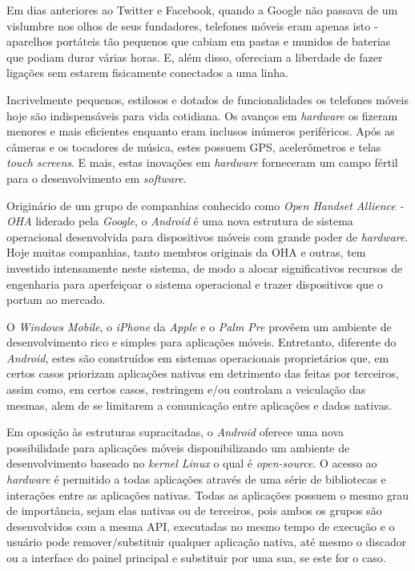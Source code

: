 \documentclass[12pt,a4paper,oneside]{report}
\begin{document}
Em dias anteriores ao Twitter e Facebook, quando a Google não passava de um vislumbre nos olhos de seus fundadores, telefones móveis eram apenas isto - aparelhos portáteis tão pequenos que cabiam em pastas e munidos de baterias que podiam durar várias horas. E, além disso, ofereciam a liberdade de fazer ligações sem estarem fisicamente conectados a uma linha.

Incrivelmente pequenos, estilosos e dotados de funcionalidades os telefones móveis hoje são indispensáveis para vida cotidiana. Os avanços em \emph{hardware} os fizeram menores e mais eficientes enquanto eram inclusos inúmeros periféricos. Após as câmeras e os tocadores de música, estes possuem GPS, acelerômetros e telas \emph{touch screens}. E mais, estas inovações em \emph{hardware} forneceram um campo fértil para o desenvolvimento em \emph{software}.

Originário de um grupo de companhias conhecido como \emph{Open Handset Allience - OHA} liderado pela \emph{Google}, o \emph{Android} é uma nova estrutura de sistema operacional desenvolvida para dispositivos móveis com grande poder de \emph{hardware}. Hoje muitas companhias, tanto membros originais da OHA e outras, tem investido intensamente neste sistema, de modo a alocar significativos recursos de engenharia para aperfeiçoar o sistema operacional e trazer dispositivos que o portam ao mercado.

O \emph{Windows Mobile}, o \emph{iPhone} da \emph{Apple} e o \emph{Palm Pre} provêem um  ambiente de desenvolvimento rico e simples para aplicações móveis. Entretanto, diferente do \emph{Android}, estes são construídos em sistemas operacionais proprietários que, em certos casos priorizam aplicações nativas em detrimento das feitas por terceiros, assim como, em certos casos, restringem e/ou controlam a veiculação das mesmas, alem de se limitarem a comunicação entre aplicações e dados nativas.

Em oposição às estruturas supracitadas, o \emph{Android} oferece uma nova possibilidade para aplicações móveis disponibilizando um ambiente de desenvolvimento baseado no \emph{kernel Linux} o qual é \emph{open-source}. O acesso ao \emph{hardware} é permitido a todas aplicações através de uma série de bibliotecas e interações entre as aplicações nativas. Todas as aplicações possuem o mesmo grau de importância, sejam elas nativas ou de terceiros, pois ambos os grupos são desenvolvidos com a mesma API, executadas no mesmo tempo de execução e o usuário pode remover/substituir qualquer aplicação nativa, até mesmo o discador ou a interface do painel principal e substituir por uma sua, se este for o caso.
\end{document}
